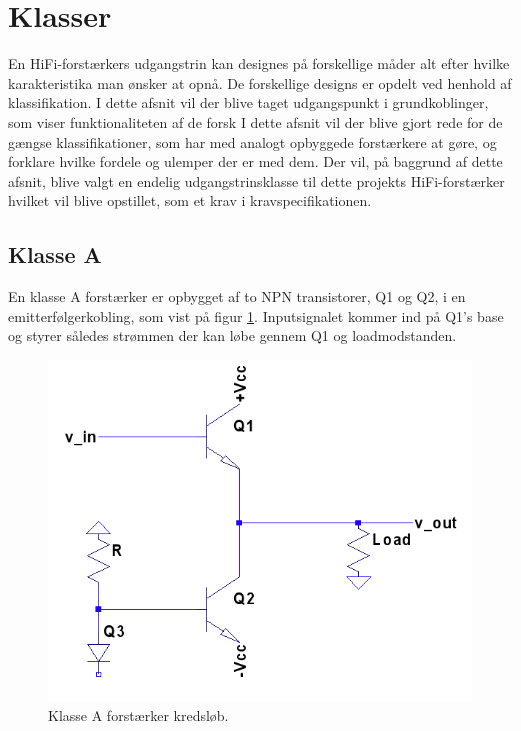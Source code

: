 \section{Klasser}
En HiFi-forstærkers udgangstrin kan designes på forskellige måder alt efter hvilke karakteristika man ønsker at opnå. De forskellige designs er opdelt ved henhold af klassifikation. I dette afsnit vil der blive taget udgangspunkt i grundkoblinger, som viser funktionaliteten af de forsk 
I dette afsnit vil der blive gjort rede for de gængse klassifikationer, som har med analogt opbyggede forstærkere at gøre, og forklare hvilke fordele og ulemper der er med dem. Der vil, på baggrund af dette afsnit, blive valgt en endelig udgangstrinsklasse til dette projekts HiFi-forstærker hvilket vil blive opstillet, som et krav i kravspecifikationen.

\subsection{Klasse A}

En klasse A forstærker er opbygget af to NPN transistorer, Q1 og Q2, i en emitterfølgerkobling, som vist på figur \ref{fig:classa}. Inputsignalet kommer ind på Q1's base og styrer således strømmen der kan løbe gennem Q1 og loadmodstanden. 

\begin{figure}[h]
\centering
\includegraphics[scale=.6]{klasser/classa.png}
\caption{Klasse A forstærker kredsløb.}
\label{fig:classa}
\end{figure}


